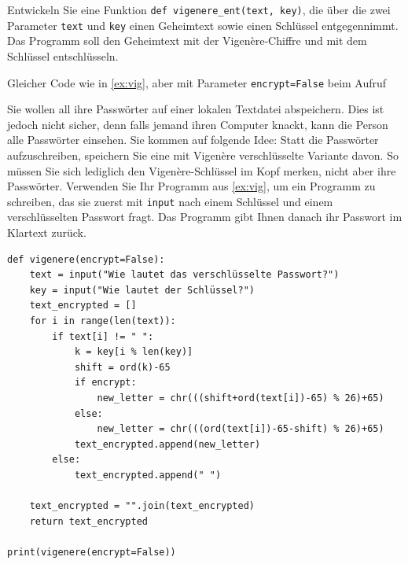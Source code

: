 \begin{myexercise}
Entwickeln Sie eine Funktion \lstinline|def vigenere_ent(text, key)|, die über die zwei Parameter \lstinline|text| und \lstinline|key| einen Geheimtext sowie einen Schlüssel entgegennimmt. Das Programm soll den Geheimtext mit der Vigenère-Chiffre und mit dem Schlüssel entschlüsseln.

\begin{myanswer}
Gleicher Code wie in \cref{ex:vig}, aber mit Parameter \lstinline|encrypt=False| beim Aufruf
\end{myanswer}
\end{myexercise}

\begin{mychallenge}
Sie wollen all ihre Passwörter auf einer lokalen Textdatei abspeichern. Dies ist jedoch nicht sicher, denn falls jemand ihren Computer knackt, kann die Person alle Passwörter einsehen. Sie kommen auf folgende Idee: Statt die Passwörter aufzuschreiben, speichern Sie eine mit Vigenère verschlüsselte Variante davon. So müssen Sie sich lediglich den Vigenère-Schlüssel im Kopf merken, nicht aber ihre Passwörter. Verwenden Sie Ihr Programm aus \cref{ex:vig}, um ein Programm zu schreiben, das sie zuerst mit \lstinline|input| nach einem Schlüssel und einem verschlüsselten Passwort fragt. Das Programm gibt Ihnen danach ihr Passwort im Klartext zurück.
\begin{myanswer}
\begin{lstlisting}
def vigenere(encrypt=False):
    text = input("Wie lautet das verschlüsselte Passwort?")
    key = input("Wie lautet der Schlüssel?")
    text_encrypted = []
    for i in range(len(text)):
        if text[i] != " ":
            k = key[i % len(key)]
            shift = ord(k)-65
            if encrypt:
                new_letter = chr(((shift+ord(text[i])-65) % 26)+65)
            else:
                new_letter = chr(((ord(text[i])-65-shift) % 26)+65)
            text_encrypted.append(new_letter)
        else:
            text_encrypted.append(" ")

    text_encrypted = "".join(text_encrypted)
    return text_encrypted
    
print(vigenere(encrypt=False))
\end{lstlisting}
\end{myanswer}
\end{mychallenge}

